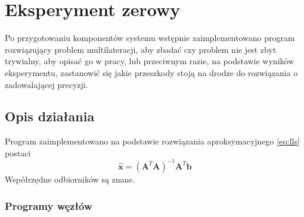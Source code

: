 \chapter{Eksperyment zerowy}\label{chap:experiment_zero}

Po przygotowaniu komponentów systemu wstępnie zaimplementowano program rozwiązujący problem multilateracji, aby zbadać czy problem nie jest zbyt trywialny, aby opisać go w pracy, lub przeciwnym razie, na podstawie wyników eksperymentu, zastanowić się jakie przeszkody stoją na drodze do rozwiązania o zadowalającej precyzji.

\section{Opis działania}

Program zaimplementowano na podstawie rozwiązania aproksymacyjnego \ref{eq:lls} postaci
\begin{equation}
    \hat{\mathbf{x}} = {\left(\mathbf{A}^T\mathbf{A}\right)}^{-1}\mathbf{A}^T\mathbf{b}
\end{equation}
Współrzędne odbiorników są znane.

\subsection{Programy węzłów}

